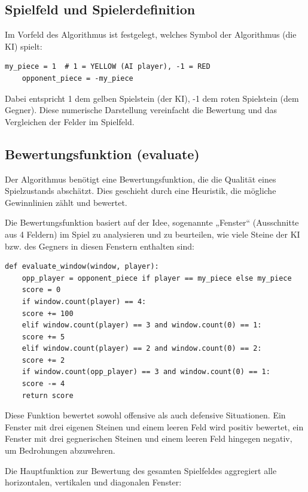 \subsection{Spielfeld und Spielerdefinition}

Im Vorfeld des Algorithmus ist festgelegt, welches Symbol der Algorithmus (die KI) spielt:

\begin{lstlisting}[style=pythonstyle]
	my_piece = 1  # 1 = YELLOW (AI player), -1 = RED
	opponent_piece = -my_piece
\end{lstlisting}

Dabei entspricht 1 dem gelben Spielstein (der KI), -1 dem roten Spielstein (dem Gegner). Diese numerische Darstellung vereinfacht die Bewertung und das Vergleichen der Felder im Spielfeld.

\subsection*{Bewertungsfunktion (evaluate)}

Der Algorithmus benötigt eine Bewertungsfunktion, die die Qualität eines Spielzustands abschätzt. Dies geschieht durch eine Heuristik, die mögliche Gewinnlinien zählt und bewertet.

Die Bewertungsfunktion basiert auf der Idee, sogenannte „Fenster“ (Ausschnitte aus 4 Feldern) im Spiel zu analysieren und zu beurteilen, wie viele Steine der KI bzw. des Gegners in diesen Fenstern enthalten sind:

\begin{lstlisting}[style=pythonstyle]
	def evaluate_window(window, player):
	opp_player = opponent_piece if player == my_piece else my_piece
	score = 0
	if window.count(player) == 4:
	score += 100
	elif window.count(player) == 3 and window.count(0) == 1:
	score += 5
	elif window.count(player) == 2 and window.count(0) == 2:
	score += 2
	if window.count(opp_player) == 3 and window.count(0) == 1:
	score -= 4
	return score
\end{lstlisting}

Diese Funktion bewertet sowohl offensive als auch defensive Situationen. Ein Fenster mit drei eigenen Steinen und einem leeren Feld wird positiv bewertet, ein Fenster mit drei gegnerischen Steinen und einem leeren Feld hingegen negativ, um Bedrohungen abzuwehren.

Die Hauptfunktion zur Bewertung des gesamten Spielfeldes aggregiert alle horizontalen, vertikalen und diagonalen Fenster:

